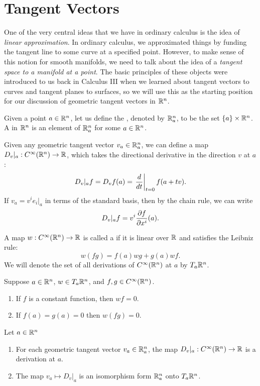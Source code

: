\newpage\setcounter{section}{2}
\section{Tangent Vectors}

One of the very central ideas that we have in ordinary calculus is the idea of \textit{linear approximation}. In ordinary calculus, we approximated things by funding the tangent line to some curve at a specified point. However, to make sense of this notion for smooth manifolds, we need to talk about the idea of a \textit{tangent space to a manifold at a point}. The basic principles of these objects were introduced to us back in Calculus III when we learned about tangent vectors to curves and tangent planes to surfaces, so we will use this as the starting position for our discussion of geometric tangent vectors in $\mathbb{R}^n$.


\dfn Given a point $a\in \mathbb{R}^n$, let us define the , denoted by $\mathbb{R}^n_a$, to be the set $\{a\}\times \mathbb{R}^n$. A  in $\mathbb{R}^n$ is an element of $\mathbb{R}^n_a$ for some $a\in \mathbb{R}^n$.

\dfn Given any geometric tangent vector $v_a\in \mathbb{R}^n_a$, we can define a map $D_v|_a:C^\infty(\mathbb{R}^n)\rightarrow \mathbb{R}$, which takes the directional derivative in the direction $v$ at $a$:
\[D_v|_a f = D_vf(a) = \left. \frac{d}{dt}\right|_{t = 0}f(a + tv).\]
If $v_a = v^ie_i|_a$ in terms of the standard basis, then by the chain rule, we can write
\[D_v|_af = v^i\frac{\partial{f}}{\partial{x^i}}(a).\]

\dfn A map $w:C^\infty(\mathbb{R}^n)\rightarrow \mathbb{R}$ is called a  if it is linear over $\mathbb{R}$ and satisfies the Leibniz rule:
\[w(fg) = f(a)wg + g(a)wf.\]
We will denote the set of all derivations of $C^\infty(\mathbb{R}^n)$ at $a$ by $T_a\mathbb{R}^n$.

\begin{lem}
Suppose $a\in \mathbb{R}^n$, $w\in T_a\mathbb{R}^n$, and $f,g\in C^\infty(\mathbb{R}^n)$.
\begin{enumerate}
    \item If $f$ is a constant function, then $wf = 0$.
    \item If $f(a) = g(a) = 0$ then $w(fg) = 0$.
\end{enumerate}
\end{lem}

\begin{prop}
Let $a\in \mathbb{R}^n$
\begin{enumerate}
    \item For each geometric tangent vector $v_a\in \mathbb{R}^n_a$, the map $D_v|_a:C^\infty(\mathbb{R}^n)\rightarrow \mathbb{R}$ is a derivation at $a$.
    \item The map $v_a\mapsto D_v|_a$ is an isomorphism form $\mathbb{R}^n_a$ onto $T_a\mathbb{R}^n$.
\end{enumerate}
\end{prop}

